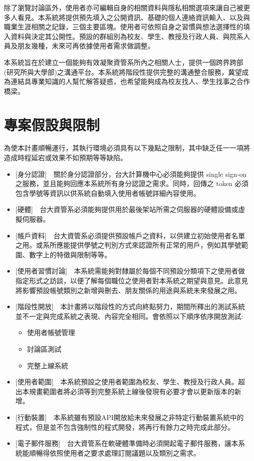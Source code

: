 \documentclass[11pt]{article}
\begin{document}
除了瀏覽討論區外，使用者亦可編輯自身的相關資料與隱私相關選項來讓自己被更多人看見。本系統將提供預先填入之公開資訊、基礎的個人連絡資訊輸入、以及與職業生涯相關之記錄，三個主要區塊。使用者可依照自身之習慣與想法選擇性的填入資料與決定其公開性。預設的群組別為校友、學生、教授及行政人員、與院系人員及朋友幾種，未來可再依據使用者需求做調整。

本系統旨在於建立一個能夠有效凝聚資管系所內之相關人士，提供一個跨界跨部(研究所與大學部)之溝通平台。本系統將階段性提供完整的溝通整合服務，冀望成為連結具專業知識的人幫忙解答疑惑，也希望能夠成為校友找人、學生找事之合作橋梁。

\section{專案假設與限制}

為使本計畫順暢運行，其執行環境必須具有以下幾點之限制，其中缺乏任一一項將造成時程延宕或效果不如預期等等缺陷。

\begin{itemize}
\item{[身分認證]~~關於身分認證部分，台大計算機中心必須能夠提供 single sign-on 之服務，並且能夠回應本系統所有身分認證之需求。同時，回傳之 token 必須包含學號等資訊以供系統自動填入使用者帳號詳細內容使用。}
\item{[硬體]~~台大資管系必須能夠提供用於最後架站所需之伺服器的硬體設備或虛擬伺服器。}
\item{[帳戶資料]~~台大資管系必須提供預設帳戶之資料，以供建立初始使用者名單之用。或系所應能提供學號之判別方式來認證所有正常的用戶，例如其學號範圍、數字上的特徵與限制等等。}
\item{[使用者習慣討論]~~本系統需能夠對隸屬於每個不同預設分類項下之使用者做指定形式之訪談，以便了解每個職位之使用者對本系統之期望與意見。此意見將影響預設帳號類別之新增與刪去、朋友關係的用途與系統未來發展之用。}
\item{[階段性開放]~~本計畫將以階段性的方式向終點努力，期間所釋出的測試系統並不一定與完成系統之表現、內容完全相同。會依照以下順序依序開放測試:
\begin{itemize}
\item{使用者帳號管理}
\item{討論區測試}
\item{完整上線系統}
\end{itemize}}
\item{[使用者範圍]~~本系統預設之使用者範圍為校友、學生、教授及行政人員。超出本規畫範圍者將必須等到完整系統上線後發現有必要才會以更新版本的新增。}
\item{[行動裝置]~~本系統雖有預設API開放給未來發展之非特定行動裝置系統中的程式，但是並不包含強制性的程式開發，將再行有餘力之時完成此部分。}
\item{[電子郵件服務]~~台大資管系在軟硬體準備時必須開起電子郵件服務，讓本系統能順暢得依照使用者之要求處理訂閱議題以及類別之需求。}
\end{itemize}
\end{document}
